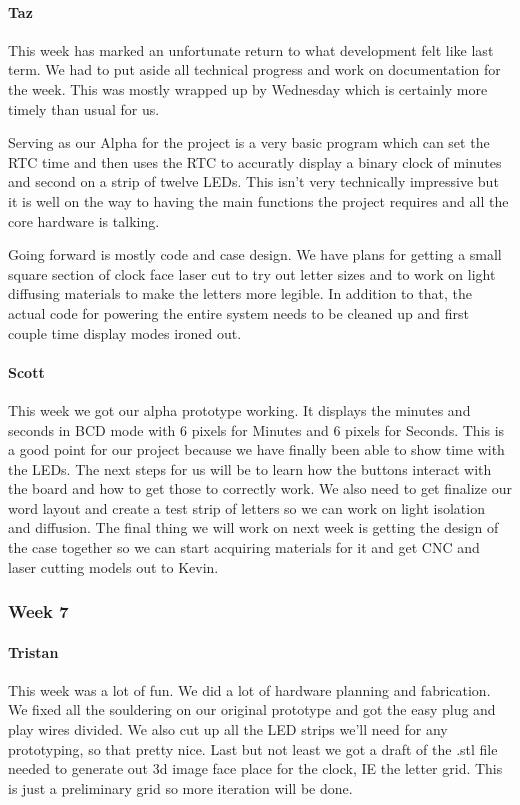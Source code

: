 \documentclass[onecolumn, draftclsnofoot,10pt, compsoc]{IEEEtran}
\begin{document}
\paragraph{Taz}
This week has marked an unfortunate return to what development felt like last term. We had to put aside all technical progress and work on documentation for the week. This was mostly wrapped up by Wednesday which is certainly more timely than usual for us.

Serving as our Alpha for the project is a very basic program which can set the RTC time and then uses the RTC to accuratly display a binary clock of minutes and second on a strip of twelve LEDs. This isn't very technically impressive but it is well on the way to having the main functions the project requires and all the core hardware is talking.

Going forward is mostly code and case design. We have plans for getting a small square section of clock face laser cut to try out letter sizes and to work on light diffusing materials to make the letters more legible. In addition to that, the actual code for powering the entire system needs to be cleaned up and first couple time display modes ironed out.
\paragraph{Scott}
This week we got our alpha prototype working. It displays the minutes and seconds in BCD mode with 6 pixels for Minutes and 6 pixels for Seconds. This is a good point for our project because we have finally been able to show time with the LEDs. The next steps for us will be to learn how the buttons interact with the board and how to get those to correctly work. We also need to get finalize our word layout and create a test strip of letters so we can work on light isolation and diffusion. The final thing we will work on next week is getting the design of the case together so we can start acquiring materials for it and get CNC and laser cutting models out to Kevin.
\subsubsection{Week 7}
\paragraph{Tristan}
This week was a lot of fun. We did a lot of hardware planning and fabrication. We fixed all the souldering on our original prototype and got the easy plug and play wires divided. We also cut up all the LED strips we'll need for any prototyping, so that pretty nice. Last but not least we got a draft of the .stl file needed to generate out 3d image face place for the clock, IE the letter grid. This is just a preliminary grid so more iteration will be done.
\end{document}
